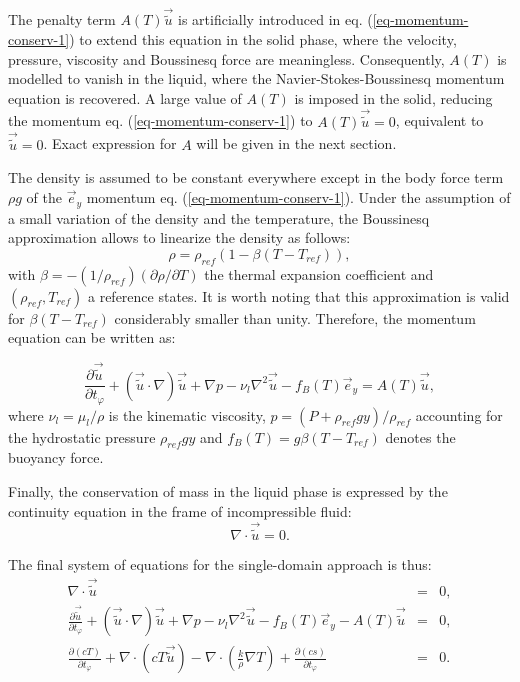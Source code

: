 The penalty term $A(T) \vec{\tilde{u}}$ is artificially introduced in eq. (\ref{eq-momentum-conserv-1}) to extend this equation in the solid phase, where the velocity, pressure, viscosity and Boussinesq force are meaningless.  Consequently, $A(T)$  is modelled to vanish in the liquid, where the Navier-Stokes-Boussinesq momentum equation is recovered. A large value of $A(T)$ is imposed in the solid, reducing the momentum eq. (\ref{eq-momentum-conserv-1})  to $A(T) \vec{\tilde{u}}=0$, equivalent to $\vec{\tilde{u}}=0$. Exact expression for $A$ will be given in the next section.

The density is assumed to be constant everywhere except in the body force term $\rho g$ of the $\vec e_y$ momentum eq. (\ref{eq-momentum-conserv-1}).
Under the assumption of a small variation of the density and the temperature, the Boussinesq approximation allows to linearize the density as follows:
\begin{equation}
   \rho = \rho_{ref} (1 - \beta (T-T_{ref})),
\end{equation}
with $\beta = - (1/\rho_{ref}) (\partial \rho / \partial T)$ the thermal expansion coefficient and $(\rho_{ref},T_{ref})$ a reference states.
It is worth noting that this approximation is valid for $\beta (T - T_{ref})$ considerably smaller than unity.
Therefore, the momentum equation can be written as:

\begin{equation}\label{eq-momentum-conserv}
  \frac{\partial \vec{\tilde{u}}}{\partial t_{\varphi}} +   {(\vec{\tilde{u}}\cdot\nabla ) \vec{\tilde{u}}} + \nabla p - \nu_{l}  {\nabla^2 \vec{\tilde{u}}} 
- f_B(T) \vec{e}_y= A(T) \vec{\tilde{u}},
\end{equation}
where  $\nu_l = \mu_l/\rho$ is the kinematic viscosity,  $p = (P + \rho_{ref} g y)/ \rho_{ref}$ accounting for the hydrostatic pressure $\rho_{ref} g y$ and $f_B(T) = g \beta (T-T_{ref})$ denotes the buoyancy force.

Finally, the conservation of mass in the liquid phase is expressed by the continuity equation in the frame of incompressible fluid:
\begin{equation}\label{eq-mass-conserv}
\nabla \cdot \vec{\tilde{u}} = 0.
\end{equation} 

The final system of equations for the single-domain approach is thus:
\begin{eqnarray} 
	\nabla \cdot \vec{\tilde{u}} &=& 0, \\
	\frac{\partial \vec{\tilde{u}}}{\partial t_{\varphi}} +   {(\vec{\tilde{u}}\cdot\nabla ) \vec{\tilde{u}}} + \nabla p - \nu_{l}  {\nabla^2 \vec{\tilde{u}}} 
- f_B(T) \vec{e}_y - A(T) \vec{\tilde{u}} & = & 0, \\
	\frac{\partial \left(c T\right)}{\partial t_{\varphi}} + \nabla \cdot\left( c T \vec{\tilde{u}}\right) -
\nabla \cdot\left( \frac{k}{\rho} \nabla T \right) +  \frac{\partial \left(c s\right)}{\partial t_{\varphi}}  &=& 0.
\end{eqnarray}


